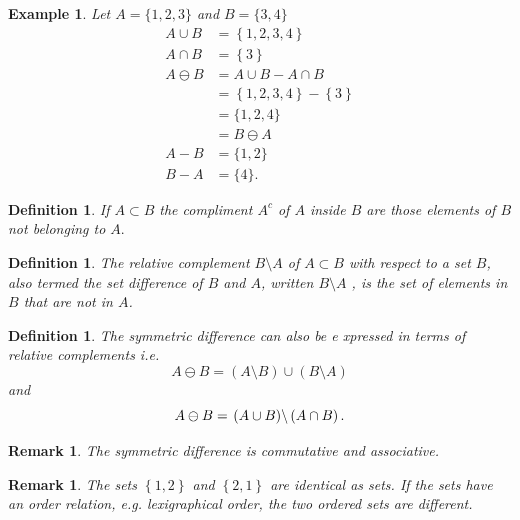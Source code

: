 \documentclass[aps,preprint]{revtex4}%
\newtheorem{definition}[theorem]{Definition}
\newtheorem{example}[theorem]{Example}
\newtheorem{remark}[theorem]{Remark}
\begin{document}
\begin{example}
Let $A=\{1,2,3\}$ and $B=\{3,4\}$%
\begin{align}
A\cup B  &  =\left\{  1,2,3,4\right\} \\
A\cap B  &  =\left\{  3\right\} \\
A\ominus B  &  =A\cup B-A\cap B\\
&  =\left\{  1,2,3,4\right\}  -\left\{  3\right\} \\
&  =\{1,2,4\}\\
&  =B\ominus A\\
A-B  &  =\{1,2\}\\
B-A  &  =\{4\}.
\end{align}

\end{example}

\begin{definition}
If $A\subset B$ the \emph{compliment} $A^{c}$ of $A$ inside $B$ are those
elements of $B$ not belonging to $A.$
\end{definition}

\begin{definition}
The \emph{relative complement} $B\setminus A$ of $A\subset B$ with respect to
a set $B$, also termed the set difference of $B$ and $A$, written $B\setminus
A$ , is the set of elements in $B$ that are not in $A$.
\end{definition}

\begin{definition}
The symmetric difference can also be e xpressed in terms of \emph{relative
complements i.e. }
\begin{equation}
A\ominus B=\left(  A\setminus B\right)  \cup\left(  B\setminus A\right)
\end{equation}
and
\begin{equation}
A\ominus B=\left.  \left(  A\cup B\right)  \right\backslash \left(  A\cap
B\right)  .
\end{equation}

\end{definition}

\begin{remark}
The symmetric difference is \emph{commutative and associative}.
\end{remark}

\begin{remark}
The sets $\left\{  1,2\right\}  $ and $\left\{  2,1\right\}  $ are identical
as sets. If the sets have an order relation, e.g. lexigraphical order, the two
\emph{ordered} sets are different.
\end{remark}
\end{document}
